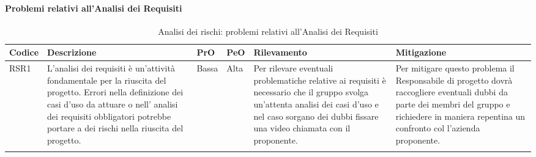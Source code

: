 \paragraph{Problemi relativi all'Analisi dei Requisiti}
\begin{center}

	\begin{longtable}{p{1cm}|p{4cm}|p{0.7cm}|p{0.7cm}|p{3cm}|p{4cm}}
		\arrayrulecolor{white}
		\hline
		\rowcolor{blue!20}
		\textbf{Codice} & 
		\textbf{Descrizione} &
		\textbf{PrO}  &
		\textbf{PeO}  &				        
		\textbf{Rilevamento} &
		\textbf{Mitigazione} \\
		\hline	
		RSR1 & L'analisi dei requisiti è un'attività fondamentale per la riuscita del progetto.  Errori nella definizione dei casi d'uso da attuare o nell' analisi dei requisiti obbligatori potrebbe portare a dei rischi nella riuscita del progetto. & Bassa & Alta & Per rilevare eventuali problematiche relative ai requisiti è necessario che il gruppo svolga un'attenta analisi dei casi d'uso e nel caso sorgano dei dubbi fissare una video chiamata con il proponente. & Per mitigare questo problema il Responsabile di progetto dovrà raccogliere eventuali dubbi da parte dei membri del gruppo e richiedere in maniera repentina un confronto col l'azienda proponente. \\
	
		\caption{Analisi dei rischi: problemi relativi all'Analisi dei Requisiti}
	\end{longtable}
\end{center}
